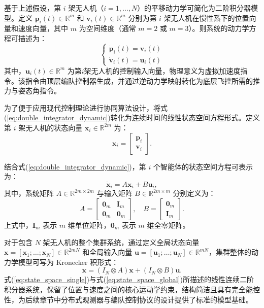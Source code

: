 基于上述假设，第 $i$ 架无人机（$i = 1, \dots, N$）的平移动力学可简化为二阶积分器模型。定义 $\mathbf{p}_i(t) \in \mathbb{R}^m$ 和 $\mathbf{v}_i(t) \in \mathbb{R}^m$ 分别为第 $i$ 架无人机在惯性系下的位置向量和速度向量，其中 $m$ 为空间维度（通常 $m=2$ 或 $m=3$）。则系统的动力学方程可描述为：
\begin{equation}
	\begin{cases}
		\dot{\mathbf{p}}_i(t) = \mathbf{v}_i(t) \\
		\dot{\mathbf{v}}_i(t) = \mathbf{u}_i(t)
	\end{cases}
	\label{eq:double_integrator_dynamic}
\end{equation}
其中，$\mathbf{u}_i(t) \in \mathbb{R}^m$ 为第$i$架无人机的控制输入向量，物理意义为虚拟加速度指令。该指令由顶层编队控制器生成，并通过逆动力学映射转化为底层飞控所需的推力与姿态角指令。

为了便于应用现代控制理论进行协同算法设计，将式(\ref{eq:double_integrator_dynamic})转化为连续时间的线性状态空间方程形式。定义第 $i$ 架无人机的状态向量 $\mathbf{x}_i \in \mathbb{R}^{2m}$ 为：
\begin{equation}
	\mathbf{x}_i = 
	\begin{bmatrix}
		\mathbf{p}_i \\
		\mathbf{v}_i
	\end{bmatrix}.
\end{equation}

结合式(\ref{eq:double_integrator_dynamic})，第 $i$ 个智能体的状态空间方程可表示为：
\begin{equation}
	\dot{\mathbf{x}}_i = A \mathbf{x}_i + B \mathbf{u}_i,
	\label{eq:state_space_single}
\end{equation}
其中，系统矩阵 $A \in \mathbb{R}^{2m \times 2m}$ 与输入矩阵 $B \in \mathbb{R}^{2m \times m}$ 分别定义为：
\begin{equation}
	A = 
	\begin{bmatrix}
		\mathbf{0}_m & \mathbf{I}_m \\
		\mathbf{0}_m & \mathbf{0}_m
	\end{bmatrix}, \quad
	B = 
	\begin{bmatrix}
		\mathbf{0}_m \\
		\mathbf{I}_m
	\end{bmatrix}.
\end{equation}
上式中，$\mathbf{I}_m$ 表示 $m$ 维单位矩阵，$\mathbf{0}_m$ 表示 $m$ 维全零矩阵。

对于包含 $N$ 架无人机的整个集群系统，通过定义全局状态向量 $\mathbf{x} = [\mathbf{x}_1;\dots;\mathbf{x}_N] \in \mathbb{R}^{2mN}$ 和全局输入向量 $\mathbf{u} = [\mathbf{u}_1;\dots;\mathbf{u}_N] \in \mathbb{R}^{mN}$，集群整体的动力学模型可写为 Kronecker 积形式：
\begin{equation}
	\dot{\mathbf{x}} = (I_N \otimes A) \mathbf{x} + (I_N \otimes B) \mathbf{u}.
	\label{eq:state_space_global}
\end{equation}
式(\ref{eq:state_space_single})与式(\ref{eq:state_space_global})所描述的线性连续二阶积分器系统，保留了位置与速度之间的核心运动学约束，结构简洁且具有完全能控性，为后续章节中分布式观测器与编队控制协议的设计提供了标准的模型基础。




